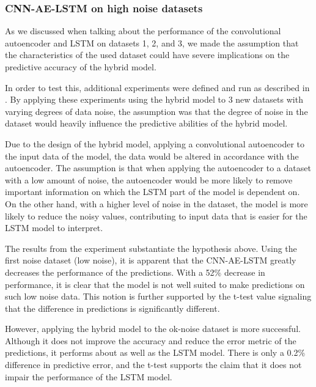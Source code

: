 \subsubsection{CNN-AE-LSTM on high noise datasets}

As we discussed when talking about the performance of the convolutional autoencoder and LSTM on datasets 1, 2, and 3,
we made the assumption that the characteristics of the used dataset could have severe implications on the predictive accuracy of the hybrid model.

In order to test this, additional experiments were defined and run as described in .
By applying these experiments using the hybrid model to 3 new datasets with varying degrees of data noise,
the assumption was that the degree of noise in the dataset would heavily influence the predictive abilities of the hybrid model.

Due to the design of the hybrid model, applying a convolutional autoencoder to the input data of the model,
the data would be altered in accordance with the autoencoder.
The assumption is that when applying the autoencoder to a dataset with a low amount of noise,
the autoencoder would be more likely to remove important information on which the LSTM part of the model is dependent on.
On the other hand, with a higher level of noise in the dataset,
the model is more likely to reduce the noisy values, contributing to input data that is easier for the LSTM model to interpret.


The results from the experiment substantiate the hypothesis above.
Using the first noise dataset (low noise), it is apparent that the CNN-AE-LSTM greatly decreases the performance of the predictions.
With a 52\% decrease in performance, it is clear that the model is not well suited to make predictions on such low noise data.
This notion is further supported by the t-test value signaling that the difference in predictions is significantly different.

However, applying the hybrid model to the ok-noise dataset is more successful.
Although it does not improve the accuracy and reduce the error metric of the predictions,
it performs about as well as the LSTM model. There is only a 0.2\% difference in predictive error,
and the t-test supports the claim that it does not impair the performance of the LSTM model.

